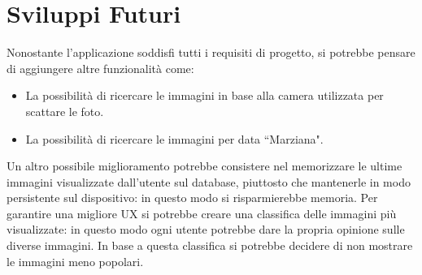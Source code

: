 \section{Sviluppi Futuri}
Nonostante l'applicazione soddisfi tutti i requisiti di progetto, si potrebbe pensare di aggiungere altre funzionalit\`a come:
\begin{itemize}
    \item La possibilit\`a di ricercare le immagini in base alla camera utilizzata per scattare le foto.
    \item La possibilit\`a di ricercare le immagini per data ``Marziana".
\end{itemize}
Un altro possibile miglioramento potrebbe consistere nel memorizzare le ultime immagini visualizzate dall'utente sul database, piuttosto che mantenerle in modo persistente sul dispositivo: in questo
modo si risparmierebbe memoria.
Per garantire una migliore UX si potrebbe creare una classifica delle immagini pi\`u visualizzate: in questo modo ogni utente potrebbe dare la propria opinione sulle diverse immagini. In base a questa
classifica si potrebbe decidere di non mostrare le immagini meno popolari.